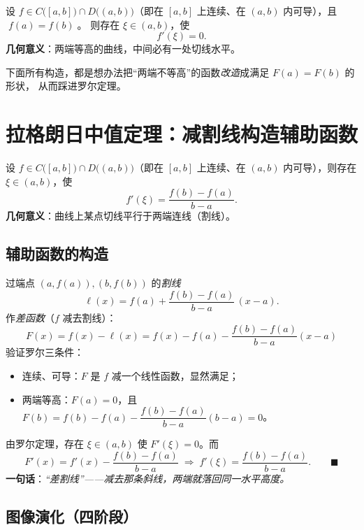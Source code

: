 \documentclass[11pt]{article}
\begin{document}
\begin{tcolorbox}[colback=white,colframe=grayt,title={\bfseries 罗尔定理 (Rolle)}]
设 $f\in C\big([a,b]\big)\cap D\big((a,b)\big)$（即在 $[a,b]$ 上连续、在 $(a,b)$ 内可导），且 $\;f(a)=f(b)\;$。
则存在 $\xi\in(a,b)$，使
\[
f'(\xi)=0 .
\]
\textbf{几何意义}：两端等高的曲线，中间必有一处切线水平。
\end{tcolorbox}

下面所有构造，都是想办法把“两端不等高”的函数\emph{改造}成满足 $F(a)=F(b)$ 的形状，
从而踩进罗尔定理。

\section{拉格朗日中值定理：减割线构造辅助函数}

\begin{tcolorbox}[colback=white,colframe=curve,title={\bfseries 拉格朗日中值定理 (Lagrange)}]
设 $f\in C\big([a,b]\big)\cap D\big((a,b)\big)$（即在 $[a,b]$ 上连续、在 $(a,b)$ 内可导），则存在 $\xi\in(a,b)$，使
\[
f'(\xi)=\frac{f(b)-f(a)}{b-a}.
\]
\textbf{几何意义}：曲线上某点切线平行于两端连线（割线）。
\end{tcolorbox}

\subsection*{辅助函数的构造}
过端点 $(a,f(a)),(b,f(b))$ 的\emph{割线}
\[
\ell(x)=f(a)+\frac{f(b)-f(a)}{b-a}\,(x-a).
\]
作\emph{差函数}（$f$ 减去割线）：
\[
\boxed{\,F(x)=f(x)-\ell(x)=f(x)-f(a)-\frac{f(b)-f(a)}{b-a}(x-a)\,}
\]
验证罗尔三条件：
\begin{itemize}
  \item 连续、可导：$F$ 是 $f$ 减一个线性函数，显然满足；
  \item 两端等高：$F(a)=0$，且 $F(b)=f(b)-f(a)-\dfrac{f(b)-f(a)}{b-a}(b-a)=0$。
\end{itemize}
由罗尔定理，存在 $\xi\in(a,b)$ 使 $F'(\xi)=0$。而
\[
F'(x)=f'(x)-\frac{f(b)-f(a)}{b-a}\;\Longrightarrow\;
f'(\xi)=\frac{f(b)-f(a)}{b-a}. \qquad\blacksquare
\]
\textbf{一句话}：\emph{“差割线”——减去那条斜线，两端就落回同一水平高度。}

\subsection*{图像演化（四阶段）}
\end{document}
